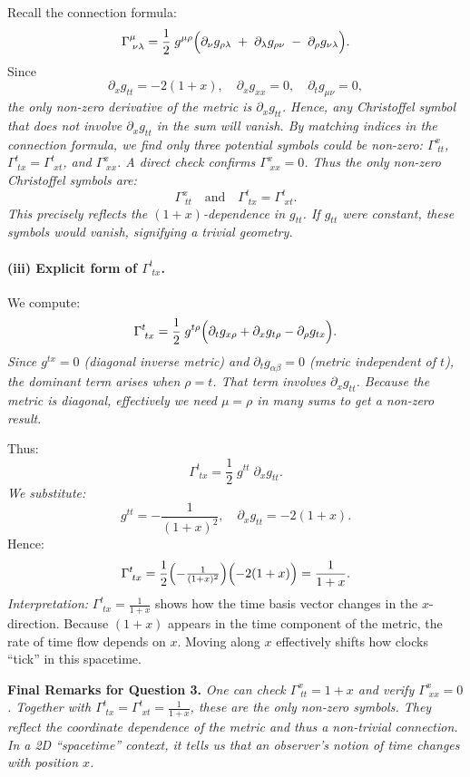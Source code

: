 \documentclass{article}
\begin{document}
Recall the connection formula:
\[
\Gamma^{\mu}_{\;\nu\lambda}
=
\frac{1}{2}\;g^{\mu\rho}
\Bigl(
\partial_\nu g_{\rho\lambda}
\;+\;
\partial_\lambda g_{\rho\nu}
\;-\;
\partial_\rho g_{\nu\lambda}
\Bigr).
\]
Since
\[
\partial_x g_{tt} = -2(1+x),
\quad
\partial_x g_{xx} = 0,
\quad
\partial_t g_{\mu\nu} = 0,
\]
\emph{the only non-zero derivative of the metric is \(\partial_x g_{tt}\). Hence, any Christoffel symbol that does not involve \(\partial_x g_{tt}\) in the sum will vanish. By matching indices in the connection formula, we find only three potential symbols could be non-zero: \(\Gamma^x_{\;tt}\), \(\Gamma^t_{\;tx} = \Gamma^t_{\;xt}\), and \(\Gamma^x_{\;xx}\). A direct check confirms \(\Gamma^x_{\;xx} = 0\). Thus the only non-zero Christoffel symbols are:}
\[
\Gamma^x_{\;tt}
\quad \text{and} \quad
\Gamma^t_{\;tx} = \Gamma^t_{\;xt}.
\]
\emph{This precisely reflects the \((1+x)\)-dependence in \(g_{tt}\). If \(g_{tt}\) were constant, these symbols would vanish, signifying a trivial geometry.}

\paragraph{(iii) Explicit form of \(\Gamma^{t}_{\;tx}\).}

We compute:
\[
\Gamma^{t}_{\;tx}
=
\frac{1}{2}\;g^{t\rho}
\Bigl(
\partial_t g_{x\rho}
+
\partial_x g_{t\rho}
-
\partial_\rho g_{tx}
\Bigr).
\]
\emph{Since \(g^{tx} = 0\) (diagonal inverse metric) and \(\partial_t g_{\alpha\beta} = 0\) (metric independent of \(t\)), the dominant term arises when \(\rho = t\). That term involves \(\partial_x g_{tt}\). Because the metric is diagonal, effectively we need \(\mu = \rho\) in many sums to get a non-zero result.}

Thus:
\[
\Gamma^{t}_{\;tx}
=
\frac{1}{2}\;g^{tt}\;\partial_x g_{tt}.
\]
\emph{We substitute:}
\[
g^{tt} = -\frac{1}{(1+x)^2},
\quad
\partial_x g_{tt} = -2(1+x).
\]
Hence:
\[
\Gamma^t_{\;tx}
=
\frac12
\Bigl(-\tfrac{1}{(1+x)^2}\Bigr)
\Bigl(-2(1+x)\Bigr)
=
\frac{1}{1+x}.
\]
\emph{Interpretation:}
\(\Gamma^{t}_{\;tx} = \frac{1}{1+x}\) shows how the time basis vector changes in the \(x\)-direction. Because \((1+x)\) appears in the time component of the metric, the rate of time flow depends on \(x\). Moving along \(x\) effectively shifts how clocks “tick” in this spacetime.

\bigskip

\textbf{Final Remarks for Question 3.}
\emph{One can check \(\Gamma^x_{\;tt} = 1 + x\) and verify \(\Gamma^x_{\;xx} = 0\). Together with \(\Gamma^t_{\;tx} = \Gamma^t_{\;xt} = \frac{1}{1+x}\), these are the only non-zero symbols. They reflect the coordinate dependence of the metric and thus a non-trivial connection. In a 2D “spacetime” context, it tells us that an observer’s notion of time changes with position \(x\).}
\end{document}
